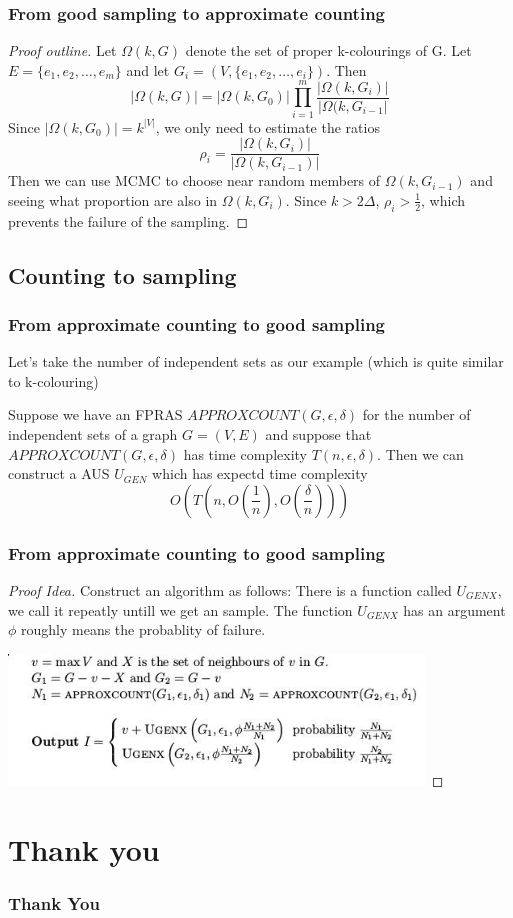 \documentclass[table, usenames,dvipsnames,svgnames]{beamer}
\begin{document}
\begin{frame}
    \frametitle{From good sampling to approximate counting}
    \pause 
    \begin{proof}[Proof outline]
        Let $\Omega(k, G)$ denote the set of proper k-colourings of G. Let $E = \{e_1, e_2, \dots, e_m\}$ and let $G_i = (V, \{e_1, e_2, \dots, e_i\})$. Then
        $$
        |\Omega(k, G)|=|\Omega(k, G_0)|\prod^m_{i=1}\frac{|\Omega(k, G_i)|}{|\Omega(k, G_{i-1}|}
        $$
        Since $|\Omega(k, G_0)|=k^{|V|}$, we only need to estimate the ratios
        $$
        \rho_i=\frac{|\Omega(k, G_i)|}{|\Omega(k, G_{i-1})|}
        $$
        Then we can use MCMC to choose near random members of $\Omega(k, G_{i-1})$ and seeing what proportion are also in $\Omega(k, G_i)$. Since $k > 2\Delta$, $\rho_i > \frac{1}{2}$, which prevents the failure of the sampling.      
    \end{proof}
\end{frame}

\subsection{Counting to sampling}

\begin{frame}
    \frametitle{From approximate counting to good sampling}
    Let's take the number of independent sets as our example (which is quite similar to k-colouring)
    \pause 
    \begin{theorem}
        Suppose we have an FPRAS $APPROXCOUNT(G, \epsilon, \delta)$ for the number of independent sets of a graph $G = (V, E)$ and suppose that $APPROXCOUNT(G, \epsilon, \delta)$ has time complexity $T(n, \epsilon, \delta)$. Then we can construct a AUS $U_{GEN}$ which has expectd time complexity 
        $$
        O(T(n, O(\frac{1}{n}), O(\frac{\delta}{n})))
        $$
    \end{theorem}
\end{frame}

\begin{frame}
    \frametitle{From approximate counting to good sampling}
    \pause 
    \begin{proof}[Proof Idea]
        Construct an algorithm as follows:
        There is a function called $U_{GENX}$, we call it repeatly untill we get an sample.
        The function $U_{GENX}$ has an argument $\phi$ roughly means the probablity of failure.

        \includegraphics[height=35mm]{prog.jpg}
    \end{proof}
\end{frame}

\section{Thank you}

\begin{frame}
    \frametitle{Thank You}
\end{frame}
\end{document}
